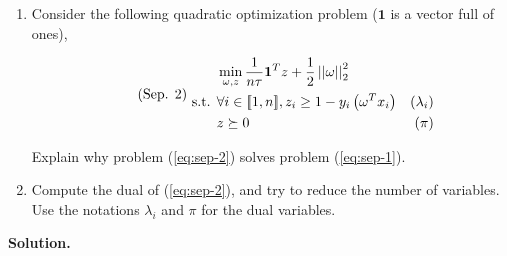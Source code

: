 \documentclass[a4paper, 11pt]{report}
\begin{document}
\begin{enumerate}
    \item Consider the following quadratic optimization problem ($\mathbf{1}$ is a vector full of ones),
    
    \begin{equation}
    \tag{Sep. 2}
        \begin{aligned}
        & \min_{\omega, z} \frac{1}{n \tau} \mathbf{1}^{T}z + \frac{1}{2} \left|\left| \omega \right|\right|_{2}^{2} \\
        \text{ s.t. }
        & \forall i \in [\![ 1, n ]\!], z_{i} \geq 1 - y_{i} \left( \omega^{T} x_{i} \right) & (\lambda_{i}) \\
        & z \succeq 0 & (\pi)
        \end{aligned}
    \label{eq:sep-2}
    \end{equation}
    
    Explain why problem (\ref{eq:sep-2}) solves problem (\ref{eq:sep-1}).
    
    \item Compute the dual of (\ref{eq:sep-2}), and try to reduce the number of variables. Use the notations $\lambda_{i}$ and $\pi$ for the dual variables.
\end{enumerate}

\noindent \textbf{Solution.}
\end{document}
